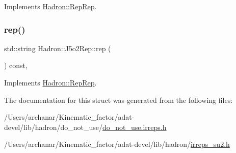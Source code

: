 Implements \mbox{\hyperlink{structHadron_1_1RepRep_ab3213025f6de249f7095892109575fde}{Hadron\+::\+Rep\+Rep}}.

\mbox{\label{structHadron_1_1J5o2Rep_a43d3fc5ff7f61a64d8dac3b700b2c140}} 
\subsubsection{\texorpdfstring{rep()}{rep()}\hspace{0.1cm}{\footnotesize\ttfamily [5/5]}}
{\footnotesize\ttfamily std\+::string Hadron\+::\+J5o2\+Rep\+::rep (\begin{DoxyParamCaption}{ }\end{DoxyParamCaption}) const\hspace{0.3cm}{\ttfamily [inline]}, {\ttfamily [virtual]}}



Implements \mbox{\hyperlink{structHadron_1_1RepRep_ab3213025f6de249f7095892109575fde}{Hadron\+::\+Rep\+Rep}}.



The documentation for this struct was generated from the following files\+:\begin{DoxyCompactItemize}
\item 
/\+Users/archanar/\+Kinematic\+\_\+factor/adat-\/devel/lib/hadron/do\+\_\+not\+\_\+use/\mbox{\hyperlink{adat-devel_2lib_2hadron_2do__not__use_2do__not__use_8irreps_8h}{do\+\_\+not\+\_\+use.\+irreps.\+h}}\item 
/\+Users/archanar/\+Kinematic\+\_\+factor/adat-\/devel/lib/hadron/\mbox{\hyperlink{adat-devel_2lib_2hadron_2irreps__su2_8h}{irreps\+\_\+su2.\+h}}\end{DoxyCompactItemize}
